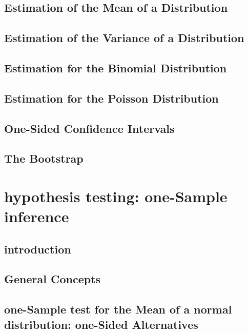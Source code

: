 \documentclass[12pt,]{article}
\theoremstyle{definition}
\theoremstyle{definition}
\theoremstyle{definition}
\theoremstyle{remark}
\begin{document}
\subsection{Estimation of the Mean of a
Distribution}\label{estimation-of-the-mean-of-a-distribution}

\subsection{Estimation of the Variance of a
Distribution}\label{estimation-of-the-variance-of-a-distribution}

\subsection{Estimation for the Binomial
Distribution}\label{estimation-for-the-binomial-distribution}

\subsection{Estimation for the Poisson
Distribution}\label{estimation-for-the-poisson-distribution}

\subsection{One-Sided Confidence
Intervals}\label{one-sided-confidence-intervals}

\subsection{The Bootstrap}\label{the-bootstrap}

\section{hypothesis testing: one-Sample
inference}\label{hypothesis-testing-one-sample-inference}

\subsection{introduction}\label{introduction-5}

\subsection{General Concepts}\label{general-concepts-1}

\subsection{one-Sample test for the Mean of a normal distribution:
one-Sided
Alternatives}\label{one-sample-test-for-the-mean-of-a-normal-distribution-one-sided-alternatives}
\end{document}
